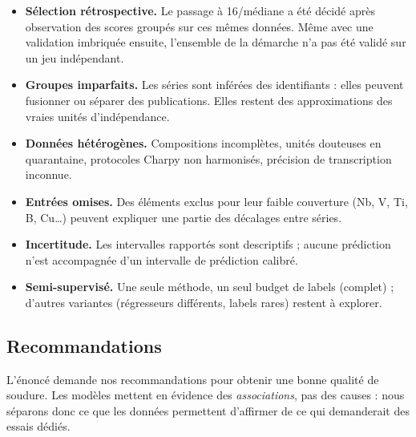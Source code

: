 \begin{itemize}
  \item \textbf{Sélection rétrospective.} Le passage à 16/médiane a été décidé après observation des scores groupés sur ces mêmes données. Même avec une validation imbriquée ensuite, l'ensemble de la démarche n'a pas été validé sur un jeu indépendant.
  \item \textbf{Groupes imparfaits.} Les séries sont inférées des identifiants : elles peuvent fusionner ou séparer des publications. Elles restent des approximations des vraies unités d'indépendance.
  \item \textbf{Données hétérogènes.} Compositions incomplètes, unités douteuses en quarantaine, protocoles Charpy non harmonisés, précision de transcription inconnue.
  \item \textbf{Entrées omises.} Des éléments exclus pour leur faible couverture (Nb, V, Ti, B, Cu\ldots) peuvent expliquer une partie des décalages entre séries.
  \item \textbf{Incertitude.} Les intervalles rapportés sont descriptifs ; aucune prédiction n'est accompagnée d'un intervalle de prédiction calibré.
  \item \textbf{Semi-supervisé.} Une seule méthode, un seul budget de labels (complet) ; d'autres variantes (régresseurs différents, labels rares) restent à explorer.
\end{itemize}

\subsection{Recommandations}
\label{subsec:recommandations}

L'énoncé demande nos recommandations pour obtenir une bonne qualité de soudure.
Les modèles mettent en évidence des \emph{associations}, pas des causes : nous
séparons donc ce que les données permettent d'affirmer de ce qui demanderait des
essais dédiés.

